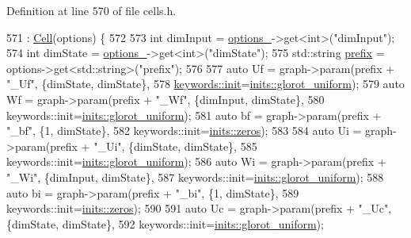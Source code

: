 Definition at line 570 of file cells.\+h.


\begin{DoxyCode}
571       : \hyperlink{classmarian_1_1rnn_1_1Cell_acc392c8adfb002c17993f02e6d3085a6}{Cell}(options) \{
572 
573     \textcolor{keywordtype}{int} dimInput = \hyperlink{classmarian_1_1rnn_1_1Stackable_a8d4661b0e78935359f7a1bb764f44dec}{options\_}->get<\textcolor{keywordtype}{int}>(\textcolor{stringliteral}{"dimInput"});
574     \textcolor{keywordtype}{int} dimState = \hyperlink{classmarian_1_1rnn_1_1Stackable_a8d4661b0e78935359f7a1bb764f44dec}{options\_}->get<\textcolor{keywordtype}{int}>(\textcolor{stringliteral}{"dimState"});
575     std::string \hyperlink{namespacemarian_1_1keywords_aa2cadd13ac94307ff92c68efb57264ac}{prefix} = options->get<std::string>(\textcolor{stringliteral}{"prefix"});
576 
577     \textcolor{keyword}{auto} Uf = graph->param(prefix + \textcolor{stringliteral}{"\_Uf"}, \{dimState, dimState\},
578                        \hyperlink{namespacemarian_1_1keywords_afdd3807e3d6fe2bc979d11fa0cf3ee3e}{keywords::init}=\hyperlink{namespacemarian_1_1inits_a8838c47537f434b855491cd3ed97ccd1}{inits::glorot\_uniform});
579     \textcolor{keyword}{auto} Wf = graph->param(prefix + \textcolor{stringliteral}{"\_Wf"}, \{dimInput, dimState\},
580                        keywords::init=\hyperlink{namespacemarian_1_1inits_a8838c47537f434b855491cd3ed97ccd1}{inits::glorot\_uniform});
581     \textcolor{keyword}{auto} bf = graph->param(prefix + \textcolor{stringliteral}{"\_bf"}, \{1, dimState\},
582                        keywords::init=\hyperlink{namespacemarian_1_1inits_a1bd34fd256e3df7bb1e27955a7f2b359}{inits::zeros});
583 
584     \textcolor{keyword}{auto} Ui = graph->param(prefix + \textcolor{stringliteral}{"\_Ui"}, \{dimState, dimState\},
585                        keywords::init=\hyperlink{namespacemarian_1_1inits_a8838c47537f434b855491cd3ed97ccd1}{inits::glorot\_uniform});
586     \textcolor{keyword}{auto} Wi = graph->param(prefix + \textcolor{stringliteral}{"\_Wi"}, \{dimInput, dimState\},
587                        keywords::init=\hyperlink{namespacemarian_1_1inits_a8838c47537f434b855491cd3ed97ccd1}{inits::glorot\_uniform});
588     \textcolor{keyword}{auto} bi = graph->param(prefix + \textcolor{stringliteral}{"\_bi"}, \{1, dimState\},
589                        keywords::init=\hyperlink{namespacemarian_1_1inits_a1bd34fd256e3df7bb1e27955a7f2b359}{inits::zeros});
590 
591     \textcolor{keyword}{auto} Uc = graph->param(prefix + \textcolor{stringliteral}{"\_Uc"}, \{dimState, dimState\},
592                        keywords::init=\hyperlink{namespacemarian_1_1inits_a8838c47537f434b855491cd3ed97ccd1}{inits::glorot\_uniform});

\end{DoxyCode}
